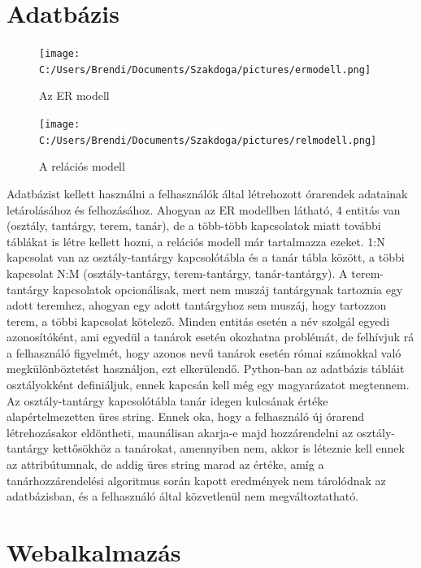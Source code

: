 \documentclass[12pt,a4paper]{report}
\begin{document}
\section{Adatbázis}

\begin{figure}
\texttt{[image: C:/Users/Brendi/Documents/Szakdoga/pictures/ermodell.png]}
\caption{Az ER modell}
\end{figure}

\begin{figure}
\texttt{[image: C:/Users/Brendi/Documents/Szakdoga/pictures/relmodell.png]}
\caption{A relációs modell}
\end{figure}

Adatbázist kellett használni a felhasználók által létrehozott órarendek adatainak letárolásához és felhozásához. Ahogyan az ER modellben látható, 4 entitás van (osztály, tantárgy, terem, tanár), de a több-több kapcsolatok miatt további táblákat is létre kellett hozni, a relációs modell már tartalmazza ezeket. 1:N kapcsolat van az osztály-tantárgy kapcsolótábla és a tanár tábla között, a többi kapcsolat N:M (osztály-tantárgy, terem-tantárgy, tanár-tantárgy). A terem-tantárgy kapcsolatok opcionálisak, mert nem muszáj tantárgynak tartoznia egy adott teremhez, ahogyan egy adott tantárgyhoz sem muszáj, hogy tartozzon terem, a többi kapcsolat kötelező. Minden entitás esetén a név szolgál egyedi azonosítóként, ami egyedül a tanárok esetén okozhatna problémát, de felhívjuk rá a felhasználó figyelmét, hogy azonos nevű tanárok esetén római számokkal való megkülönböztetést használjon, ezt elkerülendő. Python-ban az adatbázis tábláit osztályokként definiáljuk, ennek kapcsán kell még egy magyarázatot megtennem. Az osztály-tantárgy kapcsolótábla tanár idegen kulcsának értéke alapértelmezetten üres string. Ennek oka, hogy a felhasználó új órarend létrehozásakor eldöntheti, maunálisan akarja-e majd hozzárendelni az osztály-tantárgy kettősökhöz a tanárokat, amennyiben nem, akkor is léteznie kell ennek az attribútumnak, de addig üres string marad az értéke, amíg a tanárhozzárendelési algoritmus során kapott eredmények nem tárolódnak az adatbázisban, és a felhasználó által közvetlenül nem megváltoztatható.

\section{Webalkalmazás}
\end{document}

